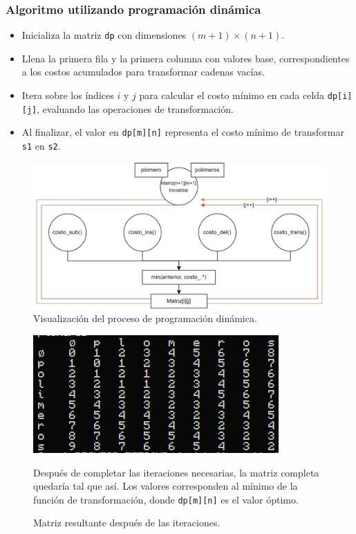 \subsubsection{Algoritmo utilizando programación dinámica}

\begin{itemize}
    \item Inicializa la matriz \texttt{dp} con dimensiones \( (m+1) \times (n+1) \).
    \item Llena la primera fila y la primera columna con valores base, correspondientes a los costos acumulados para transformar cadenas vacías.
    \item Itera sobre los índices \(i\) y \(j\) para calcular el costo mínimo en cada celda \texttt{dp[i][j]}, evaluando las operaciones de transformación.
    \item Al finalizar, el valor en \texttt{dp[m][n]} representa el costo mínimo de transformar \texttt{s1} en \texttt{s2}.
\end{itemize}

\begin{figure}[h]
    \centering
    \includegraphics[width=.7\linewidth]{AlgoReportTemplate-main/images/DinamicProgramation.png}
    \caption{Visualización del proceso de programación dinámica.}
\end{figure}

\begin{figure}[h!]
    \centering
    \begin{minipage}{0.45\textwidth}
        \centering
        \includegraphics[width=1\linewidth]{AlgoReportTemplate-main/images/Matrix.png}
        \caption{Matriz resultante después de las iteraciones.}
    \end{minipage}%
    \hspace{1em}
    \begin{minipage}{0.45\textwidth}
        Después de completar las iteraciones necesarias, la matriz completa quedaría tal que así. Los valores corresponden al mínimo de la función de transformación, donde \texttt{dp[m][n]} es el valor óptimo.
    \end{minipage}
\end{figure}

